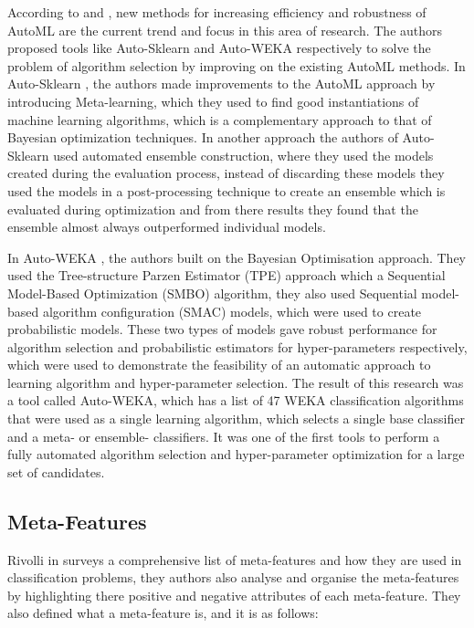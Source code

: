 According to \citep{feurer:m} and \citep{kotthoff:l}, new methods for increasing efficiency and robustness of AutoML are the current trend and focus in this area of research. The authors proposed tools like Auto-Sklearn and Auto-WEKA respectively to solve the problem of algorithm selection by improving on the existing AutoML methods. In Auto-Sklearn \citep{feurer:m}, the authors made improvements to the AutoML approach by introducing Meta-learning, which they used to find good instantiations of machine learning algorithms, which is a complementary approach to that of Bayesian optimization techniques. In another approach the authors of Auto-Sklearn used automated ensemble construction, where they used the models created during the evaluation process, instead of discarding these models they used the models in a post-processing technique to create an ensemble which is evaluated during optimization and from there results they found that the ensemble almost always outperformed individual models. 

In Auto-WEKA \citep{kotthoff:l}, the authors built on the Bayesian Optimisation approach. They used the Tree-structure Parzen Estimator (TPE) approach which a Sequential Model-Based Optimization (SMBO) algorithm, they also used Sequential model-based algorithm configuration (SMAC) models, which were used to create probabilistic models. These two types of models gave robust performance for algorithm selection and probabilistic estimators for hyper-parameters respectively, which were used to demonstrate the feasibility of an automatic approach to learning algorithm and hyper-parameter selection. The result of this research was a tool called Auto-WEKA, which has a list of 47 WEKA classification algorithms that were used as a single learning algorithm, which selects a single base classifier and a meta- or ensemble- classifiers. It was one of the first tools to perform a fully automated algorithm selection and hyper-parameter optimization for a large set of candidates.

\subsection*{Meta-Features}

Rivolli in \citep{meta-features-3} surveys a comprehensive list of meta-features and how they are used in classification problems, they authors also analyse and organise the meta-features by highlighting there positive and negative attributes of each meta-feature. They also defined what a meta-feature is, and it is as follows:

